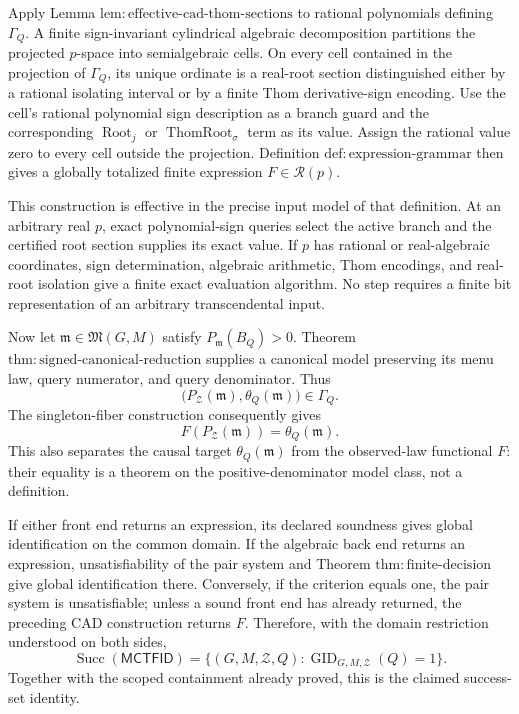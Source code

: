 Apply Lemma \(\mathrm{lem:effective\text{-}cad\text{-}thom\text{-}sections}\) to rational polynomials defining \(\Gamma_Q\).  A finite sign-invariant cylindrical algebraic decomposition partitions the projected \(p\)-space into semialgebraic cells.  On every cell contained in the projection of \(\Gamma_Q\), its unique ordinate is a real-root section distinguished either by a rational isolating interval or by a finite Thom derivative-sign encoding.  Use the cell's rational polynomial sign description as a branch guard and the corresponding \(\operatorname{Root}_j\) or \(\operatorname{ThomRoot}_{\sigma}\) term as its value.  Assign the rational value zero to every cell outside the projection.  Definition \(\mathrm{def:expression\text{-}grammar}\) then gives a globally totalized finite expression \(F\in\mathcal R(p)\).

This construction is effective in the precise input model of that definition.  At an arbitrary real \(p\), exact polynomial-sign queries select the active branch and the certified root section supplies its exact value.  If \(p\) has rational or real-algebraic coordinates, sign determination, algebraic arithmetic, Thom encodings, and real-root isolation give a finite exact evaluation algorithm.  No step requires a finite bit representation of an arbitrary transcendental input.

Now let \(\mathfrak m\in\mathfrak M(G,M)\) satisfy \(P_{\mathfrak m}(B_Q)>0\).  Theorem \(\mathrm{thm:signed\text{-}canonical\text{-}reduction}\) supplies a canonical model preserving its menu law, query numerator, and query denominator.  Thus
\[
 \bigl(P_{\mathcal Z}(\mathfrak m),\theta_Q(\mathfrak m)\bigr)
 \in\Gamma_Q.
\]
The singleton-fiber construction consequently gives
\[
 F(P_{\mathcal Z}(\mathfrak m))=\theta_Q(\mathfrak m).
\]
This also separates the causal target \(\theta_Q(\mathfrak m)\) from the observed-law functional \(F\): their equality is a theorem on the positive-denominator model class, not a definition.

If either front end returns an expression, its declared soundness gives global identification on the common domain.  If the algebraic back end returns an expression, unsatisfiability of the pair system and Theorem \(\mathrm{thm:finite\text{-}decision}\) give global identification there.  Conversely, if the criterion equals one, the pair system is unsatisfiable; unless a sound front end has already returned, the preceding CAD construction returns \(F\).  Therefore, with the domain restriction understood on both sides,
\[
 \operatorname{Succ}(\mathsf{MCTFID})
 =\{(G,M,\mathcal Z,Q):\operatorname{GID}_{G,M,\mathcal Z}(Q)=1\}.
\]
Together with the scoped containment already proved, this is the claimed success-set identity.

